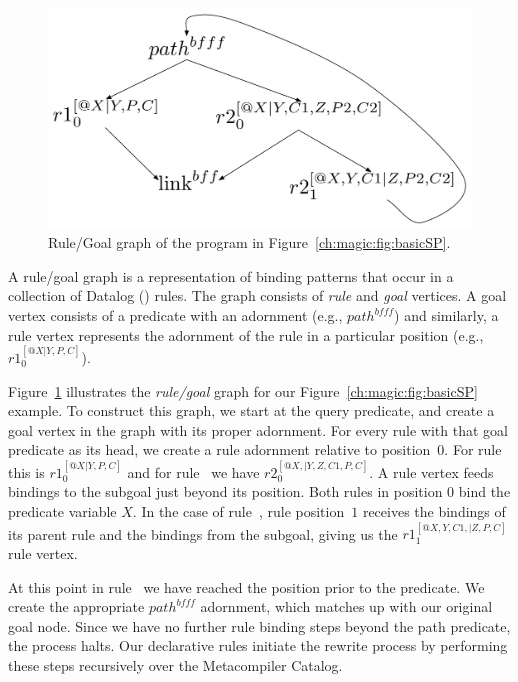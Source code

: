 \begin{figure}[!t]
\begin{center}
\includegraphics[scale=0.5]{figures/RuleGoalGraph}
\caption{\label{ch:magic:fig:rggraph}Rule/Goal graph of the program in Figure~\ref{ch:magic:fig:basicSP}.}
\end{center}
\end{figure}

A rule/goal graph is a representation of binding patterns that occur in a
collection of Datalog (\OVERLOG) rules.  The graph consists of \emph{rule} and
\emph{goal} vertices.  A goal vertex consists of a predicate with an adornment
(e.g., $path^{bfff}$) and similarly, a rule vertex represents the adornment of
the rule in a particular position (e.g., $r1_0^{[@X|Y,P,C]}$).

Figure~\ref{ch:magic:fig:rggraph} illustrates the {\em rule/goal} graph for our
Figure~\ref{ch:magic:fig:basicSP} example.  To construct this graph, we start
at the query predicate, and create a goal vertex in the graph with its proper
adornment.  For every rule with that goal predicate as its head, we create a
rule adornment relative to position~$0$.  For rule~ this is
$r1_0^{[@X|Y,P,C]}$ and for rule~ we have $r2_0^{[@X,|Y,Z,C1,P,C]}$.  A
rule vertex feeds bindings to the subgoal just beyond its position.  Both rules
in position $0$ bind the  predicate variable $X$.  In the case of
rule~, rule position~$1$ receives the bindings of its parent rule and
the bindings from the  subgoal, giving us the
$r1_1^{[@X,Y,C1,|Z,P,C]}$ rule vertex.

At this point in rule~ we have reached the position prior to the
 predicate.  We create the appropriate $path^{bfff}$ adornment, which
matches up with our original  goal node.  Since we have no further
rule binding steps beyond the path predicate, the process halts.  Our
declarative rules initiate the rewrite process by performing these steps
recursively over the Metacompiler Catalog.

